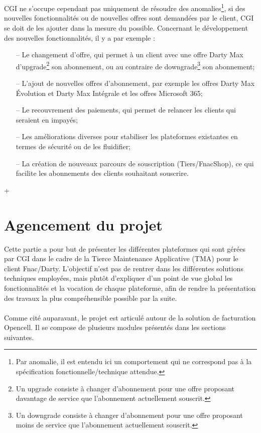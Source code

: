 \documentclass[12pt, a4paper]{report}
\begin{document}
	\\\\
	CGI ne s'occupe cependant pas uniquement de résoudre des anomalies\footnote{Par anomalie, il est entendu ici un comportement qui ne correspond pas à la spécification fonctionnelle/technique attendue.}, si des nouvelles fonctionnalités ou de nouvelles offres sont demandées par le client, CGI se doit de les ajouter dans la mesure du possible. Concernant le développement des nouvelles fonctionnalités, il y a par exemple :
	\\
	\begin{itemize}
		\item[–] Le changement d'offre, qui permet à un client avec une offre Darty Max \flqq{} d'upgrade\footnote{Un upgrade consiste à changer d'abonnement pour une offre proposant davantage de service que l'abonnement actuellement souscrit.}\frqq{} son abonnement, ou au contraire de \flqq{} downgrade\footnote{Un downgrade consiste à changer d'abonnement pour une offre proposant moins de service que l'abonnement actuellement souscrit.}\frqq{} son abonnement;
		\item[–] L'ajout de nouvelles offres d'abonnement, par exemple les offres Darty Max Évolution et Darty Max Intégrale et les offres Microsoft 365;
		\item[–] Le recouvrement des paiements, qui permet de relancer les clients qui seraient en impayés;
		\item[–] Les améliorations diverses pour stabiliser les plateformes existantes en termes de sécurité ou de les fluidifier;
		\item[–] La création de nouveaux parcours de souscription (Tiers/FnacShop), ce qui facilite les abonnements des clients souhaitant souscrire.
	\end{itemize} +

	\section{Agencement du projet}

	Cette partie a pour but de présenter les différentes plateformes qui sont gérées par CGI dans le cadre de la Tierce Maintenance Applicative (TMA) pour le client Fnac/Darty. L'objectif n'est pas de rentrer dans les différentes solutions techniques employées, mais plutôt d'expliquer d'un point de vue global les fonctionnalités et la vocation de chaque plateforme, afin de rendre la présentation des travaux la plus compréhensible possible par la suite.
	\\\\
	Comme cité auparavant, le projet est articulé autour de la solution de facturation Opencell. Il se compose de plusieurs modules présentés dans les sections suivantes.
\end{document}
